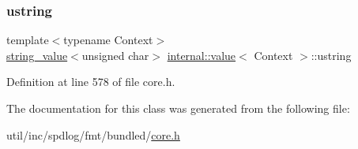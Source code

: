 \subsubsection{\texorpdfstring{ustring}{ustring}}
{\footnotesize\ttfamily template$<$typename Context$>$ \\
\hyperlink{structinternal_1_1string__value}{string\+\_\+value}$<$unsigned char$>$ \hyperlink{classinternal_1_1value}{internal\+::value}$<$ Context $>$\+::ustring}



Definition at line 578 of file core.\+h.



The documentation for this class was generated from the following file\+:\begin{DoxyCompactItemize}
\item 
util/inc/spdlog/fmt/bundled/\hyperlink{core_8h}{core.\+h}\end{DoxyCompactItemize}
